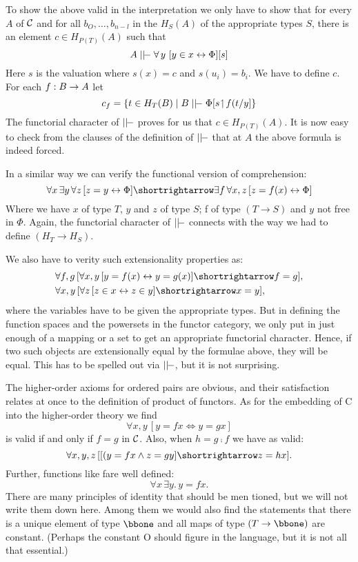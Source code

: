 To show the above valid in the interpretation we only have
to show that for every $A$ of $\mathcal C$ and for all $b_O, \dots ,b_{n-l}$ in the $H_S(A)$ of the appropriate types $S$, there is an element
$c \in H_{P(T)}(A)$ such that
$$
A \mm \forall\, y \,\, [y \in x \iff \Phi][s]
$$
%
Here $s$ is the valuation where $s(x) = c$ and $s(u_i) = b_i$. We have to define $c$. For each $f: B \rightarrow A$ let
$$
c_f = \{t \in H_T(B) \mid B \mm \Phi [s \res f(t/y] \}
$$
%
The functorial character of $\mm$ proves for us that $c \in H_{P(T)}(A)$. It is now easy to check from the clauses of the definition of $\mm$ that at $A$ the above formula is indeed forced.

In a similar way we can verify the functional version of comprehension:
$$
\forall x \, \exists y \, \forall z \, [ z = y \iff \Phi] \imp \exists f\, \forall x,z\, [z = f(x) \iff \Phi ]
$$
%
Where we have $x$ of type $T$, $y$ and $z$ of type $S$; f of type $(T\to S)$ and $y$ not free in $\Phi$. Again, the functorial character of $\mm$
connects with the way we had to define $(H_T \to H_S)$.

We also have to verity such extensionality properties as:
\begin{align*}
&\forall f,g \, [\forall x,y \, [ y = f(x) \iff y = g(x) ] \imp f = g],\\
&\forall x,y \, [\forall z \, [ z \in x \iff z \in y ] \imp x = y],
\end{align*}
%
where the variables have to be given the appropriate types. But in defining the function spaces and the powersets in the functor category, we only put in just enough of a mapping or a set to get an appropriate functorial character. Hence, if two such objects are extensionally equal by the formulae above, they will be equal. This has to be spelled out via $\mm$, but it is not surprising.

The higher-order axioms for ordered pairs are obvious, and their satisfaction relates at once to the definition of product of functors. As for the embedding of C into the higher-order theory we find
$$
\forall x,y \, [y = f x \iff y = gx]
$$
is valid if and only if $f = g$ in $\mathcal C$. Also, when $h = g \comp f$ we have as valid:
$$
\forall x,y,z\, [[(y = fx \land z = gy] \imp z = hx].
$$
Further, functions like fare well defined:
$$
\forall x\, \exists y.\, y = fx .
$$
There are many principles of identity that should be men tioned, but we will not write them down here. Among them we would also find the statements that there is a unique element of type $\bbone$ and all maps of type $(T\to \bbone )$ are constant. (Perhaps the constant O should figure in the language, but it is not all
that essential.)

